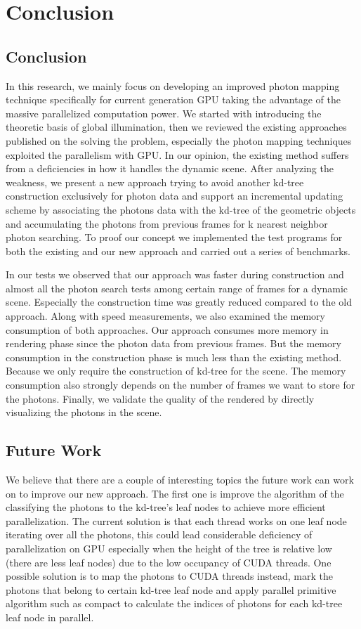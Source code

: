 \chapter{Conclusion}

\section{Conclusion}
In this research, we mainly focus on developing an improved photon mapping technique specifically for current generation GPU taking the advantage of the massive parallelized computation power. We started with introducing the theoretic basis of global illumination, then we reviewed the existing approaches published on the solving the problem, especially the photon mapping techniques exploited the parallelism with GPU. In our opinion, the existing method suffers from a deficiencies in how it handles the dynamic scene. After analyzing the weakness, we present a new approach trying to avoid another kd-tree construction exclusively for photon data and support an incremental updating scheme by associating the photons data with the kd-tree of the geometric objects and accumulating the photons from previous frames for k nearest neighbor photon searching. To proof our concept we implemented the test programs for both the existing and our new approach and carried out a series of benchmarks. 

In our tests we observed that our approach was faster during construction and almost all the photon search tests among certain range of frames for a dynamic scene. Especially the construction time was greatly reduced compared to the old approach. Along with speed measurements, we also examined the memory consumption of both approaches. Our approach consumes more memory in rendering phase since the photon data from previous frames. But the memory consumption in the construction phase is much less than the existing method. Because we only require the construction of kd-tree for the scene. The memory consumption also strongly depends on the number of frames we want to store for the photons. Finally, we validate the quality of the rendered by directly visualizing the photons in the scene. 

\section{Future Work}

We believe that there are a couple of interesting topics the future work can work on to improve our new approach. The first one is improve the algorithm of the classifying the photons to the kd-tree's leaf nodes to achieve more efficient parallelization. The current solution is that each thread works on one leaf node iterating over all the photons, this could lead considerable deficiency of parallelization on GPU especially when the height of the tree is relative low (there are less leaf nodes) due to the low occupancy of CUDA threads. One possible solution is to map the photons to CUDA threads instead, mark the photons that belong  to certain kd-tree leaf node and apply parallel primitive algorithm such as compact to calculate the indices of photons for each kd-tree leaf node in parallel. 

